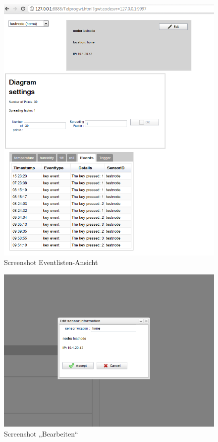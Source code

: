 \documentclass[12pt,a4paper,twoside]{article}
\begin{document}
\begin{figure}[h!]
   \centering
   \includegraphics[width=12cm]{fig/screen3.png}
   \caption{Screenshot Eventlisten-Ansicht}
   \label{screen3}
\end{figure}

\begin{figure}[h!]
   \centering
   \includegraphics[width=12cm]{fig/screen4.png}
   \caption{Screenshot „Bearbeiten“}
   \label{screen4}
\end{figure}
  
\end{document}
